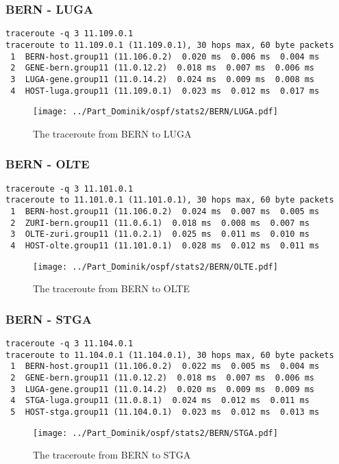 \subsubsection{BERN - LUGA}
\begin{lstlisting}
traceroute -q 3 11.109.0.1
traceroute to 11.109.0.1 (11.109.0.1), 30 hops max, 60 byte packets
 1  BERN-host.group11 (11.106.0.2)  0.020 ms  0.006 ms  0.004 ms
 2  GENE-bern.group11 (11.0.12.2)  0.018 ms  0.007 ms  0.006 ms
 3  LUGA-gene.group11 (11.0.14.2)  0.024 ms  0.009 ms  0.008 ms
 4  HOST-luga.group11 (11.109.0.1)  0.023 ms  0.012 ms  0.017 ms
\end{lstlisting}
\begin{figure}[H]
\centering
\texttt{[image: ../Part\_Dominik/ospf/stats2/BERN/LUGA.pdf]}
\caption{The traceroute from BERN to LUGA}
\end{figure}
\clearpage
\subsubsection{BERN - OLTE}
\begin{lstlisting}
traceroute -q 3 11.101.0.1
traceroute to 11.101.0.1 (11.101.0.1), 30 hops max, 60 byte packets
 1  BERN-host.group11 (11.106.0.2)  0.024 ms  0.007 ms  0.005 ms
 2  ZURI-bern.group11 (11.0.6.1)  0.018 ms  0.008 ms  0.007 ms
 3  OLTE-zuri.group11 (11.0.2.1)  0.025 ms  0.011 ms  0.010 ms
 4  HOST-olte.group11 (11.101.0.1)  0.028 ms  0.012 ms  0.011 ms
\end{lstlisting}
\begin{figure}[H]
\centering
\texttt{[image: ../Part\_Dominik/ospf/stats2/BERN/OLTE.pdf]}
\caption{The traceroute from BERN to OLTE}
\end{figure}
\clearpage
\subsubsection{BERN - STGA}
\begin{lstlisting}
traceroute -q 3 11.104.0.1
traceroute to 11.104.0.1 (11.104.0.1), 30 hops max, 60 byte packets
 1  BERN-host.group11 (11.106.0.2)  0.022 ms  0.005 ms  0.004 ms
 2  GENE-bern.group11 (11.0.12.2)  0.018 ms  0.007 ms  0.006 ms
 3  LUGA-gene.group11 (11.0.14.2)  0.020 ms  0.009 ms  0.009 ms
 4  STGA-luga.group11 (11.0.8.1)  0.024 ms  0.012 ms  0.011 ms
 5  HOST-stga.group11 (11.104.0.1)  0.023 ms  0.012 ms  0.013 ms
\end{lstlisting}
\begin{figure}[H]
\centering
\texttt{[image: ../Part\_Dominik/ospf/stats2/BERN/STGA.pdf]}
\caption{The traceroute from BERN to STGA}
\end{figure}
\clearpage
